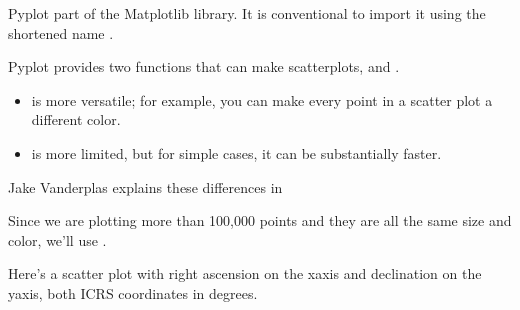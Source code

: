 \documentclass[letterpaper,10pt,english]{sphinxmanual}
\begin{document}
Pyplot part of the Matplotlib library.  It is conventional to import it using the shortened name .

Pyplot provides two functions that can make scatterplots,  and .
\begin{itemize}
\item {} 
 is more versatile; for example, you can make every point in a scatter plot a different color.

\item {} 
 is more limited, but for simple cases, it can be substantially faster.

\end{itemize}

Jake Vanderplas explains these differences in 

Since we are plotting more than 100,000 points and they are all the same size and color, we’ll use .

Here’s a scatter plot with right ascension on the x\sphinxhyphen{}axis and declination on the y\sphinxhyphen{}axis, both ICRS coordinates in degrees.

\begin{sphinxVerbatim}[commandchars=\\\{\}]
  \PYG{p}{[}\PYG{p}{]}
  \PYG{p}{[}\PYG{p}{]}
  

\end{sphinxVerbatim}

\noindent{}
\end{document}

